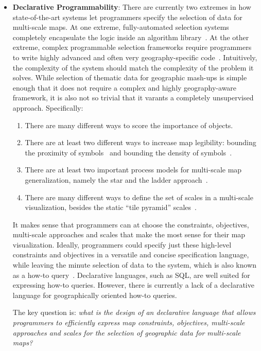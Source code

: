 \documentclass[11pt, oneside]{report}
\begin{document}
\begin{itemize}
\item \textbf{Declarative Programmability}: There are currently two extremes in how state-of-the-art systems let programmers specify the selection of data for multi-scale maps. At one extreme, fully-automated selection systems completely encapsulate the logic inside an algorithm library~\cite{sarma2012fusiontables, nutanong2012multiresolution}. At the other extreme, complex programmable selection frameworks require programmers to write highly advanced and often very geography-specific code~\cite{ware2003generalization_sa,lamy1999application}. Intuitively, the complexity of the system should match the complexity of the problem it solves. While selection of thematic data for geographic mash-ups is simple enough that it does not require a complex and highly geography-aware framework, it is also not so trivial that it varants a completely unsupervised approach. Specifically:

\begin{enumerate}
\item There are many different ways to score the importance of objects.
\item There are at least two different ways to increase map legibility: bounding the proximity of symbols~\cite{nutanong2012multiresolution} and bounding the density of symbols~\cite{woodruff1998constant}.
\item There are at least two important process models for multi-scale map generalization, namely the star and the ladder approach~\cite{foerster2010challenges}. 
\item There are many different ways to define the set of scales in a multi-scale visualization, besides the static ``tile pyramid'' scales~\cite{mbtile12}.
\end{enumerate}

It makes sense that programmers can at choose the constraints, objectives, multi-scale approaches and scales that make the most sense for their map visualization. Ideally, programmers could specify just these high-level constraints and objectives in a versatile and concise specification language, while leaving the minute selection of data to the system, which is also known as a how-to query~\cite{meliou2011reverse}. Declarative languages, such as SQL, are well suited for expressing how-to queries. However, there is currently a lack of a declarative language for geographically oriented how-to queries.

The key question is: \emph{what is the design of an declarative language that allows programmers to efficiently express map constraints, objectives, multi-scale approaches and scales for the selection of geographic data for multi-scale maps?}


\end{itemize}
\end{document}
